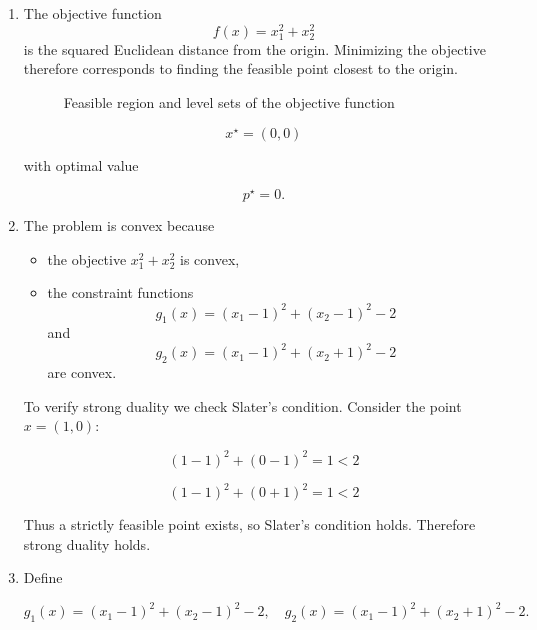 \documentclass[
	12pt,
]{fphw}
\begin{document}
\begin{enumerate}
\item[(a)]

The objective function
\[
f(x)=x_1^2+x_2^2
\]
is the squared Euclidean distance from the origin. Minimizing the objective therefore corresponds to finding the feasible point closest to the origin.

\begin{figure}[H]
\centering
{}
\caption{Feasible region and level sets of the objective function}
\end{figure}

\[
x^\star=(0,0)
\]

with optimal value

\[
p^\star=0.
\]

\item[(b)]

The problem is convex because

\begin{itemize}
\item the objective $x_1^2+x_2^2$ is convex,
\item the constraint functions
\[
g_1(x)=(x_1-1)^2+(x_2-1)^2-2
\]
and
\[
g_2(x)=(x_1-1)^2+(x_2+1)^2-2
\]
are convex.
\end{itemize}

To verify strong duality we check Slater's condition. Consider the point $x=(1,0)$:

\[
(1-1)^2+(0-1)^2=1<2
\]

\[
(1-1)^2+(0+1)^2=1<2
\]

Thus a strictly feasible point exists, so Slater's condition holds. Therefore strong duality holds.

\item[(c)]

Define

\[
g_1(x)=(x_1-1)^2+(x_2-1)^2-2,
\quad
g_2(x)=(x_1-1)^2+(x_2+1)^2-2.
\]


\end{enumerate}
\end{document}
